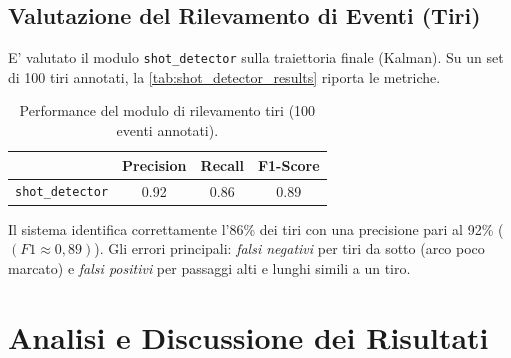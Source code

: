 \documentclass[12pt,a4paper,openright,twoside]{book}
\begin{document}

\subsection{Valutazione del Rilevamento di Eventi (Tiri)}
\label{sec:rilevamento-eventi-tiri}

E' valutato il modulo \texttt{shot\_detector} sulla 
traiettoria finale (Kalman). 
Su un set di 100 tiri annotati, la 
\autoref{tab:shot_detector_results} riporta le metriche.

\begin{table}[t]
  \centering
  \caption{Performance del modulo di rilevamento tiri (100 eventi annotati).}
  \label{tab:shot_detector_results}
  \begin{tabular}{l S[table-format=1.2] S[table-format=1.2] S[table-format=1.2]}
    \toprule
    & {\textbf{Precision}} & {\textbf{Recall}} & {\textbf{F1-Score}} \\
    \midrule
    \texttt{shot\_detector} & 0.92 & 0.86 & 0.89 \\
    \bottomrule
  \end{tabular}
\end{table}

Il sistema identifica correttamente l'86\% dei tiri 
con una precisione pari al 92\% ($(F1 \approx 0,89)$).
Gli errori principali: \emph{falsi negativi} per tiri 
da sotto (arco poco marcato) e \emph{falsi positivi} 
per passaggi alti e lunghi simili a un tiro.

\section{Analisi e Discussione dei Risultati}
\label{sec:analisi-risultati}
\end{document}
